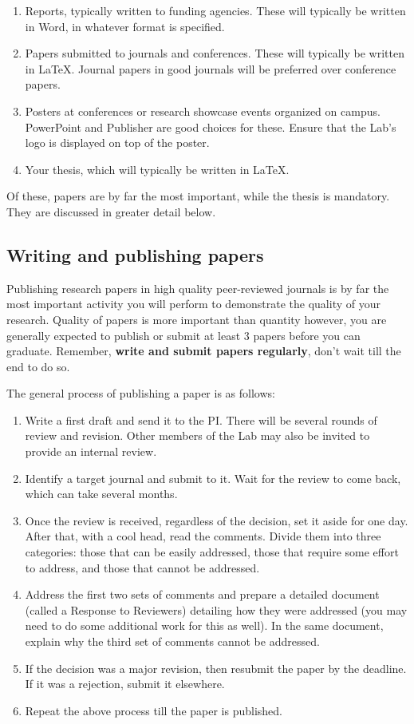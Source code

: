\documentclass[12pt]{article}
\begin{document}
\begin{enumerate}
	\item Reports, typically written to funding agencies. These will typically be written in Word, in whatever format is specified.
	\item Papers submitted to journals and conferences. These will typically be written in \LaTeX. Journal papers in good journals will be preferred over conference papers.
	\item Posters at conferences or research showcase events organized on campus. PowerPoint and Publisher are good choices for these. Ensure that the Lab's logo is displayed on top of the poster.
	\item Your thesis, which will typically be written in \LaTeX.
\end{enumerate}

Of these, papers are by far the most important, while the thesis is mandatory. They are discussed in greater detail below.

\subsection{Writing and publishing papers}
Publishing research papers in high quality peer-reviewed journals is by far the most important activity you will perform to demonstrate the quality of your research. Quality of papers is more important than quantity however, you are generally expected to publish or submit at least 3 papers before you can graduate. Remember, \textbf{write and submit papers regularly}, don't wait till the end to do so.

The general process of publishing a paper is as follows:

\begin{enumerate}
	\item Write a first draft and send it to the PI. There will be several rounds of review and revision. Other members of the Lab may also be invited to provide an internal review.
	\item Identify a target journal and submit to it. Wait for the review to come back, which can take several months.
	\item Once the review is received, regardless of the decision, set it aside for one day. After that, with a cool head, read the comments. Divide them into three categories: those that can be easily addressed, those that require some effort to address, and those that cannot be addressed.
	\item Address the first two sets of comments and prepare a detailed document (called a Response to Reviewers) detailing how they were addressed (you may need to do some additional work for this as well). In the same document, explain why the third set of comments cannot be addressed.
	\item If the decision was a major revision, then resubmit the paper by the deadline. If it was a rejection, submit it elsewhere.
	\item Repeat the above process till the paper is published.
\end{enumerate}
\end{document}
